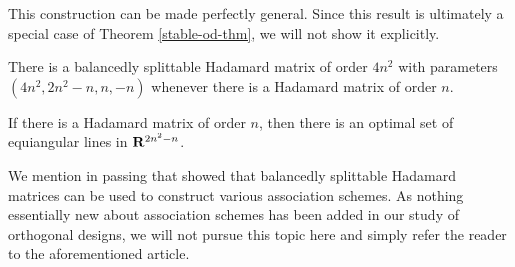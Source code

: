 \documentclass[../../../main]{subfiles}
\begin{document}
This construction can be made perfectly general. Since this result is ultimately a special case of Theorem \ref{stable-od-thm}, we will not show it explicitly.

\begin{thm}\label{stable-hadamard}
 There is a balancedly splittable Hadamard matrix of order $4n^2$ with parameters $(4n^2,2n^2-n,n,-n)$ whenever there is a Hadamard matrix of order $n$.
\end{thm}

\begin{cor}\label{optimal-lines-cor}
 If there is a Hadamard matrix of order $n$, then there is an optimal set of equiangular lines in $\mathbf{R}^{2n^2-n}$.
\end{cor}
 
 We mention in passing that \cite{splittable-hadamard} showed that balancedly splittable Hadamard matrices can be used to construct various association schemes. As nothing essentially new about association schemes has been added in our study of orthogonal designs, we will not pursue this topic here and simply refer the reader to the aforementioned article.
 
\biblio
\end{document}

